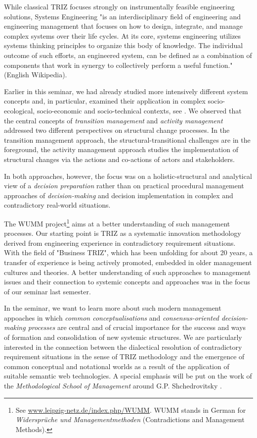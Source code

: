 \documentclass[11pt,a4paper]{article}
\begin{document}
While classical TRIZ focuses strongly on instrumentally feasible engineering
solutions, Systems Engineering "is an interdisciplinary field of engineering
and engineering management that focuses on how to design, integrate, and
manage complex systems over their life cycles. At its core, systems
engineering utilizes systems thinking principles to organize this body of
knowledge. The individual outcome of such efforts, an engineered system, can
be defined as a combination of components that work in synergy to collectively
perform a useful function." (English Wikipedia). 

Earlier in this seminar, we had already studied more intensively different
system concepts and, in particular, examined their application in complex
socio-ecological, socio-economic and socio-technical contexts, see
\cite{Notes-W19}. We observed that the central concepts of \emph{transition
  management} and \emph{activity management} addressed two different
perspectives on structural change processes. In the transition management
approach, the structural-transitional challenges are in the foreground, the
activity management approach studies the implementation of structural changes
via the actions and co-actions of actors and stakeholders.

In both approaches, however, the focus was on a holistic-structural and
analytical view of a \emph{decision preparation} rather than on practical
procedural management approaches of \emph{decision-making} and decision
implementation in complex and contradictory real-world situations.

The WUMM project\footnote{See \url{www.leipzig-netz.de/index.php/WUMM}. WUMM
  stands in German for \emph{Widersprüche und Managementmethoden}
  (Contradictions and Management Methods).} aims at a better understanding of
such management processes. Our starting point is TRIZ as a systematic
innovation methodology derived from engineering experience in contradictory
requirement situations. With the field of "Business TRIZ", which has been
unfolding for about 20 years, a transfer of experience is being actively
promoted, embedded in older management cultures and theories.  A better
understanding of such approaches to management issues and their connection to
systemic concepts and approaches was in the focus of our seminar last
semester.

In the seminar, we want to learn more about such modern management appoaches
in which \emph{common conceptualisations} and \emph{consensus-oriented
  decision-making processes} are central and of crucial importance for the
success and ways of formation and consolidation of new systemic structures.
We are particularly interested in the connection between the dialectical
resolution of contradictory requirement situations in the sense of TRIZ
methodology and the emergence of common conceptual and notational worlds as a
result of the application of suitable semantic web technologies.  A special
emphasis will be put on the work of the \emph{Methodological School of
  Management} around G.P. Shchedrovitsky \cite{MSM}.
\end{document}
